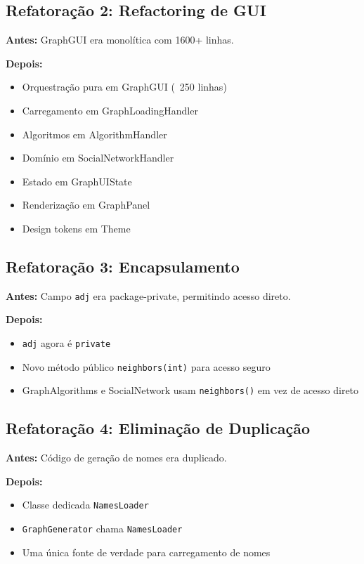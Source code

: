 \documentclass[12pt,a4paper]{article}
\begin{document}
\subsection{Refatoração 2: Refactoring de GUI}

\textbf{Antes:} GraphGUI era monolítica com 1600+ linhas.

\textbf{Depois:}
\begin{itemize}
    \item Orquestração pura em GraphGUI (~250 linhas)
    \item Carregamento em GraphLoadingHandler
    \item Algoritmos em AlgorithmHandler
    \item Domínio em SocialNetworkHandler
    \item Estado em GraphUIState
    \item Renderização em GraphPanel
    \item Design tokens em Theme
\end{itemize}

\subsection{Refatoração 3: Encapsulamento}

\textbf{Antes:} Campo \texttt{adj} era package-private, permitindo acesso direto.

\textbf{Depois:}
\begin{itemize}
    \item \texttt{adj} agora é \texttt{private}
    \item Novo método público \texttt{neighbors(int)} para acesso seguro
    \item GraphAlgorithms e SocialNetwork usam \texttt{neighbors()} em vez de acesso direto
\end{itemize}

\subsection{Refatoração 4: Eliminação de Duplicação}

\textbf{Antes:} Código de geração de nomes era duplicado.

\textbf{Depois:}
\begin{itemize}
    \item Classe dedicada \texttt{NamesLoader}
    \item \texttt{GraphGenerator} chama \texttt{NamesLoader}
    \item Uma única fonte de verdade para carregamento de nomes
\end{itemize}
\end{document}
